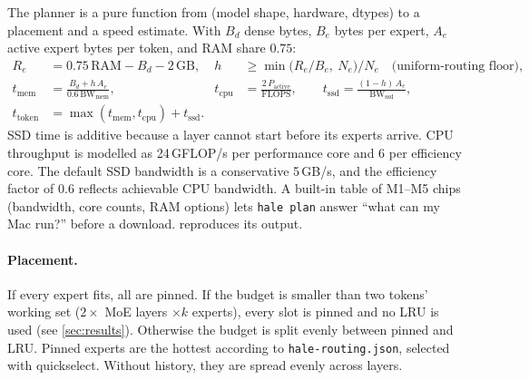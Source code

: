 \documentclass[11pt]{article}
\begin{document}
The planner is a pure function from (model shape, hardware, dtypes) to a placement and a
speed estimate. With $B_d$ dense bytes, $B_e$ bytes per expert, $A_e$ active expert bytes
per token, and RAM share $0.75$:
\begin{align}
  R_e &= 0.75\,\mathrm{RAM} - B_d - 2\,\mathrm{GB}, &
  h &\ge \min\!\big(R_e/B_e,\ N_e\big)/N_e \quad\text{(uniform-routing floor)},\\
  t_{\text{mem}} &= \frac{B_d + h\,A_e}{0.6\,\mathrm{BW}_{\text{mem}}}, &
  t_{\text{cpu}} &= \frac{2\,P_{\text{active}}}{\mathrm{FLOPS}}, \qquad
  t_{\text{ssd}} = \frac{(1-h)\,A_e}{\mathrm{BW}_{\text{ssd}}},\\
  t_{\text{token}} &= \max(t_{\text{mem}}, t_{\text{cpu}}) + t_{\text{ssd}} .
\end{align}
SSD time is additive because a layer cannot start before its experts arrive. CPU throughput
is modelled as 24\,GFLOP/s per performance core and 6 per efficiency core. The default SSD
bandwidth is a conservative 5\,GB/s, and the efficiency factor of 0.6 reflects achievable
CPU bandwidth. A built-in table of M1--M5 chips (bandwidth, core counts, RAM options) lets
\texttt{hale plan} answer ``what can my Mac run?'' before a download. 
reproduces its output.

\paragraph{Placement.} If every expert fits, all are pinned. If the budget is smaller than two
tokens' working set ($2\times$ MoE layers $\times k$ experts), every slot is pinned and no LRU
is used (see \cref{sec:results}). Otherwise the budget is split evenly between pinned and LRU.
Pinned experts are the hottest according to \texttt{hale-routing.json}, selected with
quickselect. Without history, they are spread evenly across layers.
\end{document}
